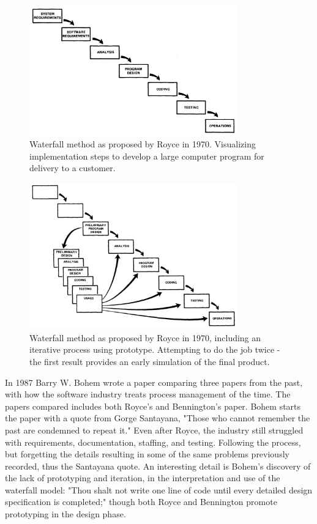 \begin{figure}
    \centering
    \includegraphics[width=0.8\textwidth]{fig/royce-waterfall.png}
    \caption{Waterfall method as proposed by Royce in 1970. Visualizing implementation steps to develop a large computer program for delivery to a customer.}
    \label{fig:royce}
\end{figure}

\begin{figure}
    \centering
    \includegraphics[width=0.8\textwidth]{fig/royce-waterfall-prototype.png}
    \caption{Waterfall method as proposed by Royce in 1970, including an iterative process using prototype. Attempting to do the job twice - the first result provides an early simulation of the final product.}
    \label{fig:royce-prototype}
\end{figure}

In 1987 Barry W. Bohem wrote a paper comparing three papers from the past, with how the software industry treats process management of the time. The papers compared includes both Royce's and Bennington's paper. Bohem starts the paper with a quote from Gorge Santayana, "Those who cannot remember the past are condemned to repeat it." Even after Royce, the industry still struggled with requirements, documentation, staffing, and testing. Following the process, but forgetting the details resulting in some of the same problems previously recorded, thus the Santayana quote. An interesting detail is Bohem's discovery of the lack of prototyping and iteration, in the interpretation and use of the waterfall model: "Thou shalt not write one line of code until every detailed design specification is completed;" though both Royce and Bennington promote prototyping in the design phase. 

